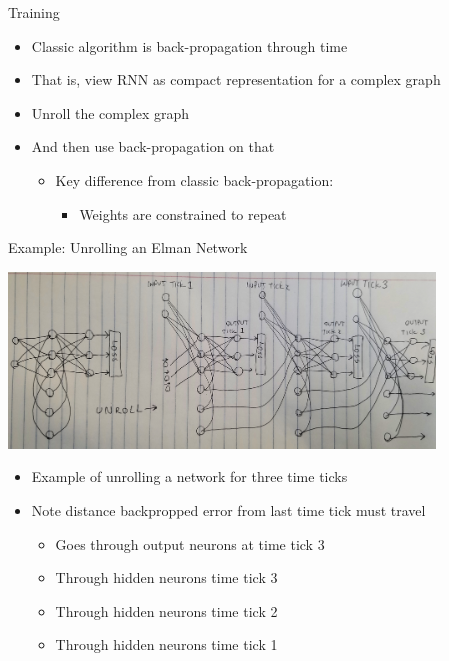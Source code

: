 \documentclass[aspectratio=169]{beamer}
\begin{document}
\begin{frame}{Training}

\begin{itemize}
        \item Classic algorithm is back-propagation through time
	\item That is, view RNN as compact representation for a complex graph
	\item Unroll the complex graph
	\item And then use back-propagation on that
	\begin{itemize}
		\item Key difference from classic back-propagation:
	\begin{itemize}
		\item Weights are constrained to repeat
	\end{itemize}
	\end{itemize}
\end{itemize}
\end{frame}
\begin{frame}{Example: Unrolling an Elman Network}

\includegraphics[width=0.85\textwidth]{lectRNN/Unrolled.jpg}

\begin{itemize}
	\item Example of unrolling a network for three time ticks
	\item Note distance backpropped error from last time tick must travel
	\begin{itemize}
		\item Goes through output neurons at time tick 3
		\item Through hidden neurons time tick 3
		\item Through hidden neurons time tick 2
		\item Through hidden neurons time tick 1
	\end{itemize}
\end{itemize}
\end{frame}
\end{document}
